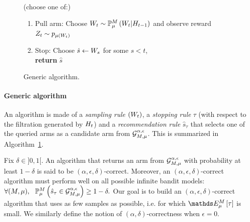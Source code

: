 \begin{figure}
\vspace{-15pt}
\begin{minipage}{0.4\textwidth}
\begin{algorithm}[H]
%
\caption{Generic algorithm.}
\label{algo:Generic}
\begin{algorithmic}
%
%
 \STATE(choose one of:){
 \begin{enumerate}
 \item Pull arm: Choose $W_t \sim \mathbb{P}_{\mu}^M\left( W_t |
H_{t-1} \right)$
     and observe reward $Z_t \sim p_{\mu(W_t)}$
 \item Stop: Choose $\hat{s} \gets W_s$ for some $s < t$, \\
	{\textbf{return} $\hat{s}$} 
\end{enumerate}
 }
\ENDFOR
\end{algorithmic}
\end{algorithm}
\end{minipage}
\vspace{-15pt}
\end{figure}

\paragraph{Generic algorithm}  An algorithm is made of a
\emph{sampling rule} $(W_t)$, a \emph{stopping rule} $\tau$ (with
respect to the filtration generated by $H_t$) and a \emph{recommendation rule}
$\hat{s}_\tau$ that selects one of the queried arms as a candidate arm from
$\mathcal{G}_{M,\mu}^{\alpha,\epsilon}$. This is summarized in
Algorithm~\ref{algo:Generic}.


Fix $\delta \in ]0,1[$.
An algorithm that returns an arm from $\mathcal{G}_{M,\mu}^{\alpha,\epsilon}$
with probability at least $1-\delta$ is said to be
$(\alpha,\epsilon,\delta)$-correct.
Moreover, an $(\alpha,\epsilon,\delta)$-correct algorithm must perform
well on
all possible infinite bandit models:
$
\forall (M, \mu), \ \
\mathbb{P}_{\mu}^M\left(  \hat{s}_\tau \in \mathcal{G}_{M,\mu}^{\alpha,\epsilon}  \right)
	\geq 1 - \delta.
$
Our
goal is to build an $(\alpha,\epsilon,\delta)$-correct algorithm that uses as
few
samples as possible, i.e. for which $\ETrueModel{\tau}$ is small.
We similarly define the notion of $(\alpha,\delta)$-correctness
when
$\epsilon=0$.


